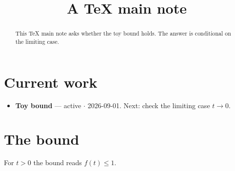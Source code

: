 \documentclass{article}
\begin{document}
\title{A TeX main note}
\maketitle
\begin{abstract}
This TeX main note asks whether the toy bound holds. The answer is conditional on the limiting case.
\end{abstract}
\section{Current work}
\begin{itemize}
\item \textbf{Toy bound} --- active $\cdot$ 2026-09-01. Next: check the limiting case $t \to 0$.
\end{itemize}
\section{The bound}\label{sec:bound}
For $t > 0$ the bound reads $f(t) \le 1$.
\end{document}
